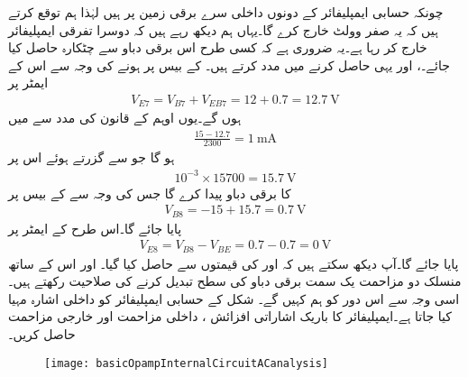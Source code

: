 چونکہ حسابی ایمپلیفائر کے دونوں داخلی سرے برقی زمین پر ہیں لہٰذا ہم توقع کرتے ہیں کہ یہ صفر وولٹ خارج کرے گا۔یہاں ہم دیکھ رہے ہیں کہ دوسرا  تفرقی ایمپلیفائر  خارج کر رہا ہے۔یہ ضروری ہے کہ کسی طرح اس برقی دباو سے چٹکارہ حاصل کیا جائے۔،  اور  یہی حاصل کرنے میں مدد کرتے ہیں۔ کے بیس پر  ہونے کی وجہ سے اس کے ایمٹر پر 
\begin{align*}
V_{E7}=V_{B7}+V_{EB7}=12+0.7=\SI{12.7}{\volt}
\end{align*}
ہوں گے۔یوں اوہم کے قانون کی مدد سے  میں
\begin{align*}
\frac{15-12.7}{2300}=\SI{1}{\milli \ampere}
\end{align*}
ہو گا جو  سے گزرتے ہوئے اس پر
\begin{align*}
10^{-3} \times 15700=\SI{15.7}{\volt}
\end{align*}
کا برقی دباو پیدا کرے گا جس کی وجہ سے  کے بیس پر
\begin{align*}
V_{B8}=-15+15.7=\SI{0.7}{\volt}
\end{align*}
پایا جائے گا۔اس طرح  کے ایمٹر پر
\begin{align*}
V_{E8}=V_{B8}-V_{BE}=0.7-0.7=\SI{0}{\volt}
\end{align*}
پایا جائے گا۔آپ دیکھ سکتے ہیں کہ  اور  کی قیمتوں سے  حاصل کیا گیا۔ اور اس کے ساتھ منسلک دو مزاحمت یک سمت برقی دباو کی سطح تبدیل کرنے کی صلاحیت رکھتے ہیں۔اسی وجہ سے اس دور کو ہم  کہیں گے۔
شکل  کے حسابی ایمپلیفائر کو داخلی اشارہ  مہیا کیا جاتا ہے۔ایمپلیفائر کا باریک اشاراتی افزائش ، داخلی مزاحمت اور خارجی مزاحمت حاصل کریں۔
\begin{figure}
\centering
\texttt{[image: basicOpampInternalCircuitACanalysis]}
\caption{}
\label{شکل_تفرقی_حسابی_ایمپلیفائر_دور_بدلتا_مساوی_دور}
\end{figure}

